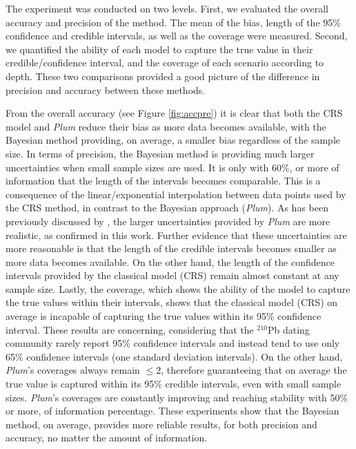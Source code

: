 \documentclass [10pt] {article}
\begin{document}
The experiment was conducted on two levels.
First, we evaluated the overall accuracy and precision of the method.
The mean of the bias, length of the 95\% confidence and credible intervals, as well as the coverage were measured.
Second, we quantified the ability of each model to capture the true value in their credible/confidence interval, and the coverage of each scenario according to depth. 
These two comparisons provided a good picture of the difference in precision and accuracy between these methods.

From the overall accuracy (see Figure \ref{fig:accpre}) it is clear that both the CRS model and \textit{Plum} reduce their bias as more data becomes available, with the Bayesian method providing, on average, a smaller bias regardless of the sample size. 
In terms of precision, the Bayesian method is providing much larger uncertainties when small sample sizes are used. 
It is only with 60\%, or more of information that the length of the intervals becomes comparable. 
This is a consequence of the linear/exponential interpolation between data points used by the CRS method, in contrast to the Bayesian approach (\textit{Plum}).  
As has been previously discussed by \citet{Aquino2020}, the larger uncertainties provided by \textit{Plum} are more realistic, as confirmed in this work.
Further evidence that these uncertainties are more reasonable is that the length of the credible intervals becomes smaller as more data becomes available. 
On the other hand, the length of the confidence intervals provided by the classical model (CRS) remain almost constant at any sample size.
Lastly, the coverage, which shows the ability of the model to capture the true values within their intervals, shows that the classical model (CRS) on average is incapable of capturing the true values within its 95\% confidence interval. 
These results are concerning, considering that the $^{210}$Pb dating community rarely report 95\% confidence intervals and instead tend to use only 65\% confidence intervals (one standard deviation intervals).
On the other hand, \textit{Plum}'s coverages always remain $\leq 2$, therefore guaranteeing that on average the true value is captured within its 95\% credible intervals, even with small sample sizes.
\textit{Plum}'s coverages are constantly improving and reaching stability with 50\% or more, of information percentage.
These experiments show that the Bayesian method, on average, provides more reliable results, for both precision and accuracy, no matter the amount of information.
\end{document}

